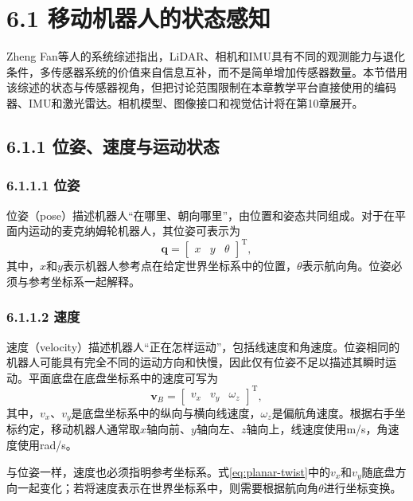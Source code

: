 \documentclass[UTF8,zihao=-4]{ctexart}
\newcommand{\vect}[1]{\bm{#1}}
\begin{document}
\section*{6.1 移动机器人的状态感知}

Zheng Fan等人的系统综述指出，LiDAR、相机和IMU具有不同的观测能力与退化条件，多传感器系统的价值来自信息互补，而不是简单增加传感器数量\cite{fan2025fusion}。本节借用该综述的状态与传感器视角，但把讨论范围限制在本章教学平台直接使用的编码器、IMU和激光雷达。相机模型、图像接口和视觉估计将在第10章展开。

\subsection*{6.1.1 位姿、速度与运动状态}

\subsubsection*{6.1.1.1 位姿}

位姿（pose）描述机器人“在哪里、朝向哪里”，由位置和姿态共同组成。对于在平面内运动的麦克纳姆轮机器人，其位姿可表示为
\begin{equation}
  \vect{q}=
  \begin{bmatrix}
    x & y & \theta
  \end{bmatrix}^{\mathrm T},
  \label{eq:planar-pose}
\end{equation}
其中，$x$和$y$表示机器人参考点在给定世界坐标系中的位置，$\theta$表示航向角。位姿必须与参考坐标系一起解释。

\subsubsection*{6.1.1.2 速度}

速度（velocity）描述机器人“正在怎样运动”，包括线速度和角速度。位姿相同的机器人可能具有完全不同的运动方向和快慢，因此仅有位姿不足以描述其瞬时运动。平面底盘在底盘坐标系中的速度可写为
\begin{equation}
  \vect{v}_B=
  \begin{bmatrix}
    v_x & v_y & \omega_z
  \end{bmatrix}^{\mathrm T},
  \label{eq:planar-twist}
\end{equation}
其中，$v_x$、$v_y$是底盘坐标系中的纵向与横向线速度，$\omega_z$是偏航角速度。根据右手坐标约定，移动机器人通常取$x$轴向前、$y$轴向左、$z$轴向上，线速度使用\si{m/s}，角速度使用\si{rad/s}\cite{rep103}。

与位姿一样，速度也必须指明参考坐标系。式\eqref{eq:planar-twist}中的$v_x$和$v_y$随底盘方向一起变化；若将速度表示在世界坐标系中，则需要根据航向角$\theta$进行坐标变换。
\end{document}
